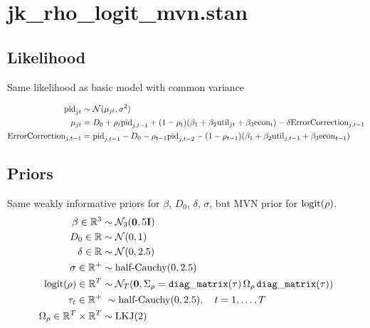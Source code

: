 \documentclass[11pt, oneside]{article}
\newcommand{\mc}[1]{\mathcal{#1}}
\begin{document}
\section*{jk\_rho\_logit\_mvn.stan}
\subsection*{Likelihood} 

Same likelihood as basic model with common variance 

\begin{align*}
{\rm pid}_{jt} &
	\sim \mc{N}(\mu_{jt}, \sigma^2)  \\
%	
\mu_{jt} &= 
	D_0 + \rho_t {\rm pid}_{j, t-1} + 
	(1-\rho_t)(\beta_1 + \beta_2 {\rm util}_{jt} + \beta_3 {\rm econ}_t) - 
	\delta {\rm ErrorCorrection}_{j,t-1} \\
%	
 {\rm ErrorCorrection}_{j,t-1} &= 
 	{\rm pid}_{j, t-1} - D_0 - \rho_{t-1} {\rm pid}_{j, t-2} - 
	(1 - \rho_{t-1}) (\beta_1 + \beta_2 {\rm util}_{j,t-1} + \beta_3 {\rm econ}_{t-1}) 
%	
\end{align*}



\subsection*{Priors} 

Same weakly informative priors for $\beta$, $D_0$, $\delta$, $\sigma$, but MVN prior for $\rm{logit}(\rho)$. \\
 
\begin{align*}
	\beta \in \mathbb{R}^3 &\sim \mc{N}_3(\mathbf{0}, 5\mathbf{I}) \\
	D_0 \in \mathbb{R} &\sim \mc{N}(0,1) \\
	\delta \in \mathbb{R} &\sim \mc{N}(0, 2.5)\\
	\sigma \in \mathbb{R}^+ &\sim \text{half-Cauchy}(0, 2.5) \\
	{\rm logit}(\rho) \in \mathbb{R}^T &\sim \mc{N}_T (\mathbf{0},  \Sigma_\rho  = {\tt diag\_matrix}(\tau) \, \Omega_\rho \, {\tt diag\_matrix}(\tau))\\
	\tau_t \in \mathbb{R}^+ &~ \sim  \text{half-Cauchy}(0, 2.5), \quad t = 1, \dots, T	 \\
	\Omega_\rho \in \mathbb{R}^T \times \mathbb{R}^T  &\sim \rm{LKJ}(2) \\
\end{align*}
\end{document}
